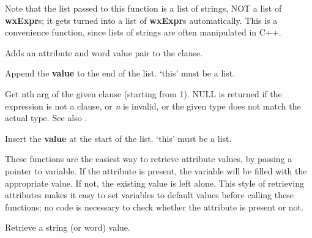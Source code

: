Note that the list passed to this function is a list of strings, NOT a list
of {\bf wxExpr}s; it gets turned into a list of {\bf wxExpr}s
automatically. This is a convenience function, since lists of strings
are often manipulated in C++.

\label{wxexpraddattributevalueword}


Adds an attribute and word value pair to the clause.

\label{wxexprappend}


Append the {\bf value} to the end of the list. `this' must be a list.

\label{wxexprarg}


Get nth arg of the given clause (starting from 1). NULL is returned if
the expression is not a clause, or {\it n} is invalid, or the given type
does not match the actual type. See also .

\label{wxexprinsert}


Insert the {\bf value} at the start of the list. `this' must be a list.

\label{wxexprgetattributevalue}

These functions are the easiest way to retrieve attribute values, by
passing a pointer to variable. If the attribute is present, the
variable will be filled with the appropriate value.  If not, the
existing value is left alone.  This style of retrieving attributes
makes it easy to set variables to default values before calling these
functions; no code is necessary to check whether the attribute is
present or not.


Retrieve a string (or word) value.


